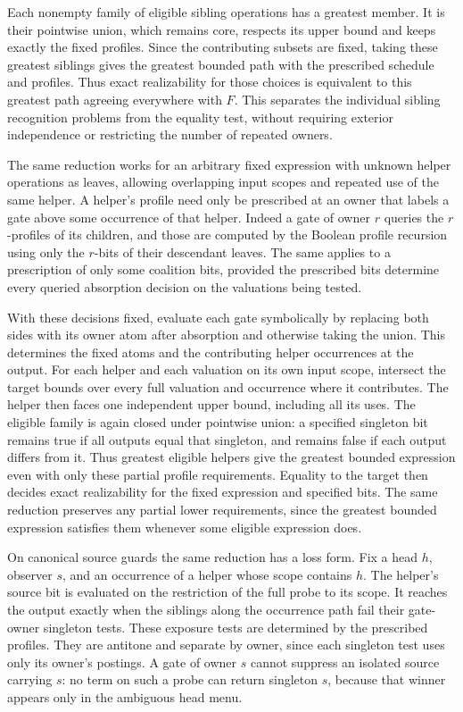 Each nonempty family of eligible sibling operations has a
greatest member. It is their pointwise union, which remains
core, respects its upper bound and keeps exactly the fixed
profiles. Since the contributing subsets are fixed, taking
these greatest siblings gives the greatest bounded path
with the prescribed schedule and profiles. Thus exact
realizability for those choices is equivalent to this greatest
path agreeing everywhere with $F$. This separates the
individual sibling recognition problems from the equality
test, without requiring exterior independence or restricting
the number of repeated owners.

The same reduction works for an arbitrary fixed expression
with unknown helper operations as leaves, allowing overlapping
input scopes and repeated use of the same helper. A helper's
profile need only be prescribed at an owner that labels a gate
above some occurrence of that helper. Indeed a gate of owner
$r$ queries the $r$-profiles of its children, and those are
computed by the Boolean profile recursion using only the
$r$-bits of their descendant leaves. The same applies to a
prescription of only some coalition bits, provided the
prescribed bits determine every queried absorption decision
on the valuations being tested.

With these decisions fixed, evaluate each gate symbolically by
replacing both sides with its owner atom after absorption and
otherwise taking the union. This determines the fixed atoms
and the contributing helper occurrences at the output. For
each helper and each valuation on its own input scope, intersect
the target bounds over every full valuation and occurrence
where it contributes. The helper then faces one independent
upper bound, including all its uses. The eligible family is
again closed under pointwise union: a specified singleton bit
remains true if all outputs equal that singleton, and remains
false if each output differs from it. Thus greatest eligible
helpers give the greatest bounded expression even with only
these partial profile requirements. Equality to the target
then decides exact realizability for the fixed expression
and specified bits. The same reduction preserves any partial
lower requirements, since the greatest bounded expression
satisfies them whenever some eligible expression does.

On canonical source guards the same reduction has a loss form.
Fix a head $h$, observer $s$, and an occurrence of a helper
whose scope contains $h$. The helper's source bit is evaluated
on the restriction of the full probe to its scope. It reaches
the output exactly when the siblings along the occurrence path
fail their gate-owner singleton tests. These exposure tests
are determined by the prescribed profiles. They are antitone
and separate by owner, since each singleton test uses only its
owner's postings. A gate of owner $s$ cannot suppress an
isolated source carrying $s$: no term on such a probe can
return singleton $s$, because that winner appears only in
the ambiguous head menu.

